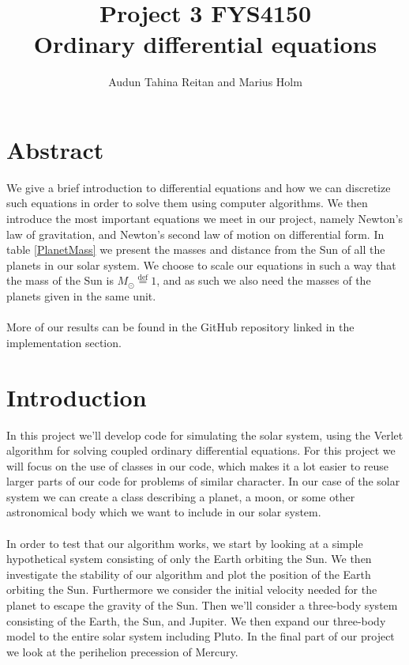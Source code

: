 \documentclass[a4paper, fontsize=11pt]{article}
\begin{document}
\title{Project 3 FYS4150 \\ Ordinary differential equations}
\author{Audun Tahina Reitan and Marius Holm}

\maketitle


\section{Abstract}
We give a brief introduction to differential equations and how we can discretize such equations in order to solve them using computer algorithms. We then introduce the most important equations we meet in our project, namely Newton's law of gravitation, and Newton's second law of motion on differential form. In table \ref{PlanetMass} we present the masses and distance from the Sun of all the planets in our solar system. We choose to scale our equations in such a way that the mass of the Sun is $M_{\odot}\overset{\text{def}}{=} 1$, and as such we also need the masses of the planets given in the same unit.

\paragraph{}
More of our results can be found in the GitHub repository linked in the implementation section. 

\section{Introduction}
In this project we'll develop code for simulating the solar system, using the Verlet algorithm for solving coupled ordinary differential equations. For this project we will focus on the use of classes in our code, which makes it a lot easier to reuse larger parts of our code for problems of similar character. In our case of the solar system we can create a class describing a planet, a moon, or some other astronomical body which we want to include in our solar system.


\paragraph{}
In order to test that our algorithm works, we start by looking at a simple hypothetical system consisting of only the Earth orbiting the Sun. We then investigate the stability of our algorithm and plot the position of the Earth orbiting the Sun. Furthermore we consider the initial velocity needed for the planet to escape the gravity of the Sun. Then we'll consider a three-body system consisting of the Earth, the Sun, and Jupiter. We then expand our three-body model to the entire solar system including Pluto. In the final part of our project we look at the perihelion precession of Mercury.
\end{document}
